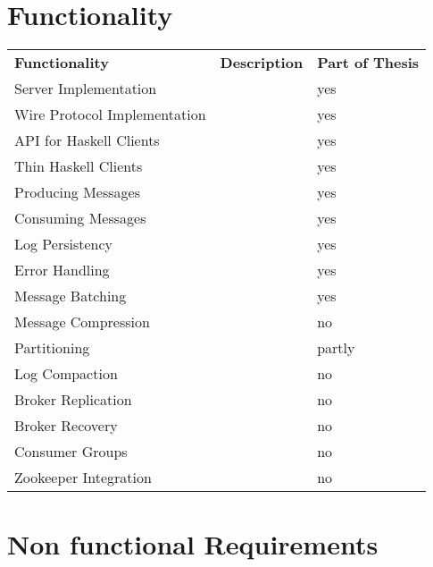 \section{Functionality}
\begin{table}[h]
\begin{tabular}{lll}
\textbf{Functionality}       & \textbf{Description} & \textbf{Part of Thesis} \\
Server Implementation        &                      & yes                     \\
Wire Protocol Implementation &                      & yes                     \\
API for Haskell Clients      &                      & yes                     \\
Thin Haskell Clients         &                      & yes                     \\
Producing Messages           &                      & yes                     \\
Consuming Messages           &                      & yes                     \\
Log Persistency              &                      & yes                     \\
Error Handling               &                      & yes                     \\
Message Batching             &                      & yes                     \\
Message Compression          &                      & no                      \\
Partitioning                 &                      & partly                  \\
Log Compaction               &                      & no                      \\
Broker Replication           &                      & no                      \\
Broker Recovery              &                      & no                      \\
Consumer Groups              &                      & no                      \\
Zookeeper Integration        &                      & no                     
\end{tabular}
\end{table}

\section{Non functional Requirements}

